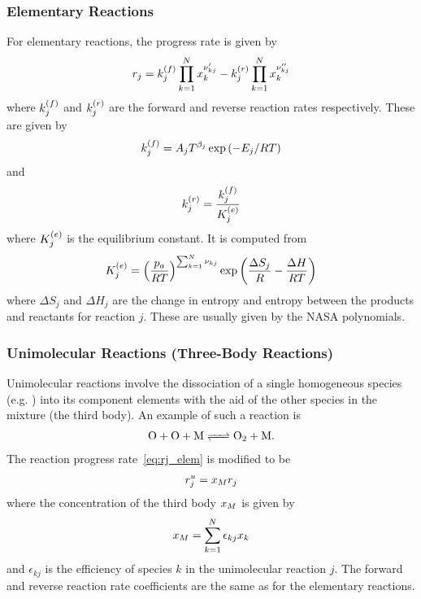 \subsubsection{Elementary Reactions}
For elementary reactions, the progress rate is given by 
\begin{align}
  r_{j} = k_{j}^{\left(f\right)}\prod_{k=1}^{N}{x_{k}^{\nu_{kj}^{\prime}}} - 
          k_{j}^{\left(r\right)}\prod_{k=1}^{N}{x_{k}^{\nu_{kj}^{\prime\prime}}} \label{eq:rj_elem}
\end{align}
where $k_{j}^{\left(f\right)}$ and $k_{j}^{\left(r\right)}$ are the forward and reverse reaction rates 
respectively.  These are given by 
\begin{align}
  k_{j}^{\left(f\right)} = A_{j}T^{\beta_{j}}\exp\left(-E_{j}/RT\right)
\end{align}
and 
\begin{align}
  k_{j}^{\left(r\right)} = \frac{k_{j}^{\left(f\right)}}{K_{j}^{\left(e\right)}}
\end{align}
where $K_{j}^{\left(e\right)}$ is the equilibrium constant.  It is computed from 
\begin{align}
  K_{j}^{\left(e\right)} = \left(\frac{p_{a}}{RT}\right)^{\sum_{k=1}^{N}{\nu_{kj}}}\exp\left(\frac{\Delta S_{j}}{R} - \frac{\Delta H}{RT}\right)
\end{align}
where $\Delta S_{j}$ and $\Delta H_{j}$ are the change in entropy and entropy 
between the products and reactants for reaction $j$.  These are usually given 
by the NASA polynomials.

\subsubsection{Unimolecular Reactions (Three-Body Reactions)}
Unimolecular reactions involve the dissociation of a single 
homogeneous species (e.g. ) into its component elements 
with the aid of the other species in the mixture (the third body). 
An example of such a reaction is 
\begin{align}
  \ce{O + O + M <=> O2 + M}.
\end{align}
The reaction progress rate~\eqref{eq:rj_elem} is modified to be 
\begin{align}
  r_{j}^{u} = x_{M}r_{j}
\end{align} 
where the concentration of the third body $x_{M}$ is given by 
\begin{align}
  x_{M} = \sum_{k=1}^{N}{\epsilon_{kj}x_{k}}
\end{align}
and $\epsilon_{kj}$ is the efficiency of species $k$ in the 
unimolecular reaction $j$.  The forward and reverse reaction 
rate coefficients are the same as for the elementary reactions.

